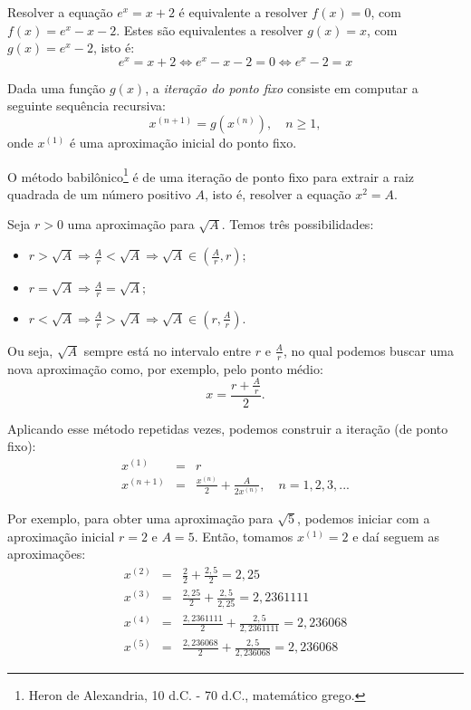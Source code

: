 \begin{ex}\label{ex:ponto_fixo_1}
  Resolver a equação $e^x = x + 2$ é equivalente a resolver $f(x) = 0$, com $f(x) = e^x - x - 2$. Estes são equivalentes a resolver $g(x) = x$, com $g(x) = e^x - 2$, isto é:
  \begin{equation}
    e^x = x + 2 \Leftrightarrow e^x - x - 2 = 0 \Leftrightarrow e^x - 2 = x
  \end{equation}
\end{ex}

Dada uma função $g(x)$, a \emph{iteração do ponto fixo} consiste em computar a seguinte sequência recursiva:
\begin{equation}
  x^{(n+1)} = g(x^{(n)}), \quad n\geq 1,
\end{equation}
onde $x^{(1)}$ é uma aproximação inicial do ponto fixo.

\begin{ex}
O método babilônico\footnote{Heron de Alexandria, 10 d.C. - 70 d.C., matemático grego.} é de uma iteração de ponto fixo para extrair a raiz quadrada de um número positivo $A$, isto é, resolver a equação $x^2 = A$.

Seja $r>0$ uma aproximação para $\sqrt{A}$. Temos três possibilidades:
\begin{itemize}
\item $r>\sqrt{A} \Longrightarrow \frac{A}{r}<\sqrt{A} \Longrightarrow \sqrt{A}\in \left(\frac{A}{r}, r\right);$
\item $r=\sqrt{A} \Longrightarrow \frac{A}{r}=\sqrt{A};$
\item $r<\sqrt{A} \Longrightarrow \frac{A}{r}>\sqrt{A} \Longrightarrow \sqrt{A}\in \left(r, \frac{A}{r}\right).$
\end{itemize}
Ou seja, $\sqrt{A}$ sempre está no intervalo entre $r$ e $\frac{A}{r}$, no qual podemos buscar uma nova aproximação como, por exemplo, pelo ponto médio:
\begin{equation} x=\frac{r+\frac{A}{r}}{2}. \end{equation}

Aplicando esse método repetidas vezes, podemos construir a iteração (de ponto fixo):
\begin{eqnarray}
x^{(1)}&=&r \\
x^{(n+1)}&=&\frac{x^{(n)}}{2}+\frac{A}{2x^{(n)}}, \quad n=1,2,3,...
\end{eqnarray}

Por exemplo, para obter uma aproximação para $\sqrt{5}$, podemos iniciar com a aproximação inicial $r=2$ e $A=5$. Então, tomamos $x^{(1)} = 2$ e daí seguem as aproximações:
\begin{eqnarray}
x^{(2)}&=&\frac{2}{2}+\frac{2,5}{2} = 2,25\\
x^{(3)}&=&\frac{2,25}{2}+\frac{2,5}{2,25}= 2,2361111  \\
x^{(4)}&=&\frac{2,2361111}{2}+\frac{2,5}{2,2361111}= 2,236068  \\
x^{(5)}&=&\frac{2,236068}{2}+\frac{2,5}{2,236068}= 2,236068
\end{eqnarray}
\end{ex}


